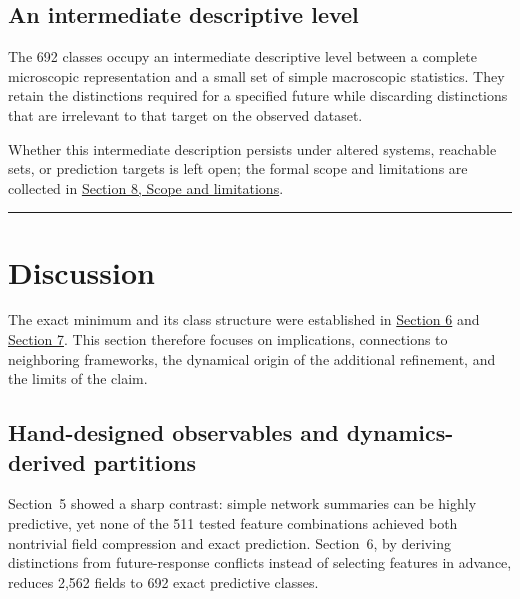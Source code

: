 \documentclass[
  11pt,
]{article}
\begin{document}
\hypertarget{an-intermediate-descriptive-level}{%
\subsection{An intermediate descriptive
level}\label{an-intermediate-descriptive-level}}

The 692 classes occupy an intermediate descriptive level between a
complete microscopic representation and a small set of simple
macroscopic statistics. They retain the distinctions required for a
specified future while discarding distinctions that are irrelevant to
that target on the observed dataset.

Whether this intermediate description persists under altered systems,
reachable sets, or prediction targets is left open; the formal scope and
limitations are collected in \hyperref[scope-and-limitations]{Section 8, Scope and limitations}.

\begin{center}\rule{0.5\linewidth}{0.5pt}\end{center}

\section{Discussion}\label{discussion}

The exact minimum and its class structure were established in
\hyperref[exact-minimum-predictive-partition]{Section 6} and
\hyperref[structure-and-interpretation-of-the-minimum-partition]{Section 7}. This
section therefore focuses on implications, connections to neighboring
frameworks, the dynamical origin of the additional refinement, and the
limits of the claim.

\hypertarget{hand-designed-observables-and-dynamics-derived-partitions}{%
\subsection{Hand-designed observables and dynamics-derived
partitions}\label{hand-designed-observables-and-dynamics-derived-partitions}}

Section~5 showed a sharp contrast: simple network summaries can be highly
predictive, yet none of the 511 tested feature combinations achieved both
nontrivial field compression and exact prediction. Section~6, by deriving
distinctions from future-response conflicts instead of selecting features
in advance, reduces 2,562 fields to 692 exact predictive classes.
\end{document}
